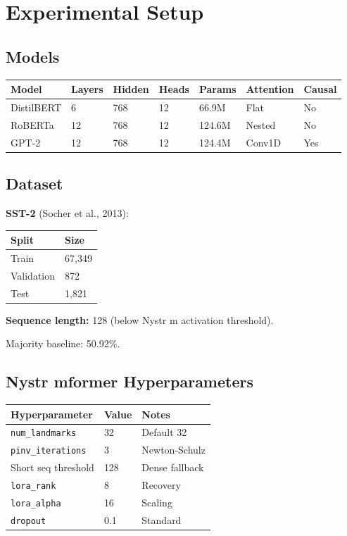 
\section{Experimental Setup}

\subsection{Models}

\begin{table}[H]
\centering
\small
\begin{tabular}{lllllll}
\toprule
\textbf{Model} & \textbf{Layers} & \textbf{Hidden} & \textbf{Heads} & \textbf{Params} & \textbf{Attention} & \textbf{Causal} \\
\midrule
DistilBERT & 6 & 768 & 12 & 66.9M & Flat & No \\
RoBERTa & 12 & 768 & 12 & 124.6M & Nested & No \\
GPT-2 & 12 & 768 & 12 & 124.4M & Conv1D & Yes \\
\bottomrule
\end{tabular}
\end{table}

\subsection{Dataset}

\textbf{SST-2} (Socher et al., 2013):

\begin{table}[H]
\centering
\small
\begin{tabular}{ll}
\toprule
\textbf{Split} & \textbf{Size} \\
\midrule
Train & 67,349 \\
Validation & 872 \\
Test & 1,821 \\
\bottomrule
\end{tabular}
\end{table}

\textbf{Sequence length:} 128 (below Nystr m activation threshold).

Majority baseline: 50.92\%.

\subsection{Nystr mformer Hyperparameters}

\begin{table}[H]
\centering
\small
\begin{tabular}{lll}
\toprule
\textbf{Hyperparameter} & \textbf{Value} & \textbf{Notes} \\
\midrule
\texttt{num\_landmarks} & 32 & Default 32 \\
\texttt{pinv\_iterations} & 3 & Newton-Schulz \\
Short seq threshold & 128 & Dense fallback \\
\texttt{lora\_rank} & 8 & Recovery \\
\texttt{lora\_alpha} & 16 & Scaling \\
\texttt{dropout} & 0.1 & Standard \\
\bottomrule
\end{tabular}
\end{table}

